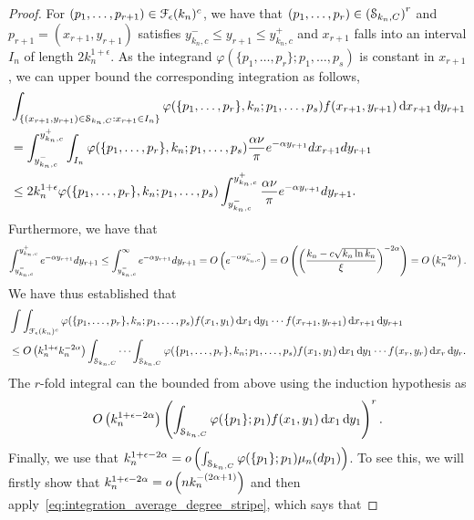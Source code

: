 \begin{proof}
For $(p_1,\dots,p_{r+1})\in \mathcal{F}_\epsilon(k_n)^c$, we have that $(p_1,\dots,p_r) \in \left(\mathcal{S}_{k_n,C}\right)^r$ and $p_{r+1}=(x_{r+1},y_{r+1})$ satisfies $y_{k_n,c}^-\leq y_{r+1}\leq y_{k_n,c}^+$ and $x_{r+1}$ falls into an interval $I_n$ of length $2k_n^{1+\epsilon}$.
As the integrand $\varphi(\{p_1,\dots,p_r\};p_1,\dots,p_s)$ is constant in $x_{r+1}$, we can upper bound the corresponding integration as follows,
\begin{align*}
	&\int_{\{(x_{r+1},y_{r+1})\in\mathcal{S}_{k_n,C}: x_{r+1}\in I_n\}} \varphi(\{p_1,\dots,p_r\}, k_n ;p_1,\dots,p_s) 
		f(x_{r+1},y_{r+1})\operatorname{\mathrm{d}\hspace{-2pt}} x_{r+1} \operatorname{\mathrm{d}\hspace{-2pt}} y_{r+1} \\
	&= \int_{y_{k_n,c}^-}^{y_{k_n,c}^+} \int_{I_n} \varphi(\{p_1,\dots,p_r\}, k_n ;p_1,\dots,p_s)\frac{\alpha \nu}{\pi} e^{-\alpha y_{r+1}} dx_{r+1}dy_{r+1} \\
	&\leq 2k_n^{1+\epsilon} \varphi(\{p_1,\dots,p_r\}, k_n ;p_1,\dots,p_s)\int_{y_{k_n,c}^-}^{y_{k_n,c}^+}  \frac{\alpha \nu}{\pi} e^{-\alpha y_{r+1}} dy_{r+1}.
\end{align*}
Furthermore, we have that
\begin{align*}
\int_{y_{k_n,c}^-}^{y_{k_n,c}^+} e^{-\alpha y_{r+1}}dy_{r+1} \leq \int_{y_{k_n,c}^-}^\infty e^{-\alpha y_{r+1}}dy_{r+1} = O\left(e^{-\alpha y_{k_n,c}^-}\right) = O\left(\left( \frac{k_n-c\sqrt{k_n\ln k_n}}{\xi}\right)^{-2\alpha}\right) = O\left(k_n^{-2\alpha}\right).
\end{align*}
We have thus established that
\begin{align*}
	&\int \int_{\mathcal{F}_\epsilon(k_n)^c} \varphi(\{p_1,\dots,p_r\}, k_n ;p_1,\dots,p_s)
		f(x_1,y_1) \operatorname{\mathrm{d}\hspace{-2pt}} x_1 \operatorname{\mathrm{d}\hspace{-2pt}} y_1 \cdots f(x_{r+1},y_{r+1})\operatorname{\mathrm{d}\hspace{-2pt}} x_{r+1} \operatorname{\mathrm{d}\hspace{-2pt}} y_{r+1}\\
	&\leq O\left(k_n^{1+\epsilon} k_n^{-2\alpha}\right)\int_{\mathcal{S}_{k_n,C}} \cdots \int_{\mathcal{S}_{k_n,C}} 
		\varphi(\{p_1,\dots,p_r\}, k_n ;p_1,\dots,p_s) f(x_1,y_1) \operatorname{\mathrm{d}\hspace{-2pt}} x_1 \operatorname{\mathrm{d}\hspace{-2pt}} y_1 \cdots f(x_{r},y_{r})\operatorname{\mathrm{d}\hspace{-2pt}} x_{r} \operatorname{\mathrm{d}\hspace{-2pt}} y_{r}.
\end{align*}
The $r$-fold integral can the bounded from above using the induction hypothesis as
\begin{align}\label{eq:indhyp}
	O\left(k_n^{1+\epsilon-2\alpha}\right)\left(\int_{\mathcal{S}_{k_n,C}} \varphi(\{p_1\};p_1) f(x_1,y_1) \operatorname{\mathrm{d}\hspace{-2pt}} x_1 \operatorname{\mathrm{d}\hspace{-2pt}} y_1\right)^r .
\end{align}
Finally, we use that $k_n^{1+\epsilon-2\alpha} = o\left(\int_{\mathcal{S}_{k_n,C}} \varphi(\{p_1\};p_1)\mu_n(dp_1)\right)$. To see this, we will firstly show that $k_n^{1+\epsilon-2\alpha} = o\left(nk_n^{-(2\alpha+1)}\right)$ and then apply~\eqref{eq:integration_average_degree_stripe}, which says that

\end{proof}
